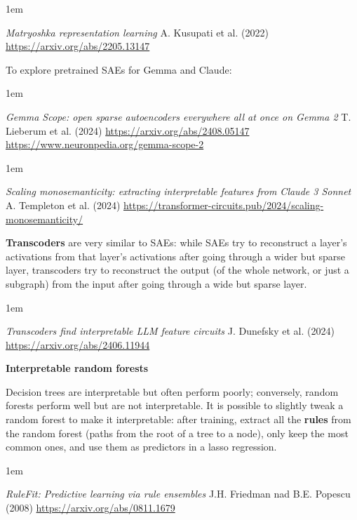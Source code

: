 \documentclass[a5paper]{article}
\let\d\textbf
\newenvironment{reference}{%
  \medskip\goodbreak
  \parskip 0pt
  \raggedright
  \leftskip 1em
  \obeylines
}{\par\medskip\goodbreak}
\def\subsection#1{{\par\bigskip\goodbreak\large\bfseries #1\par}}
\begin{document}
\begin{reference}
  \emph{Matryoshka representation learning}
  A. Kusupati et al. (2022)
  \url{https://arxiv.org/abs/2205.13147}
\end{reference}

To explore pretrained SAEs for Gemma and Claude:

\begin{reference}
  \emph{Gemma Scope: open sparse autoencoders everywhere all at once on Gemma 2}
  T. Lieberum et al. (2024)
  \url{https://arxiv.org/abs/2408.05147}
  \url{https://www.neuronpedia.org/gemma-scope-2}
\end{reference}

\begin{reference}
  \emph{Scaling monosemanticity: extracting interpretable features from Claude 3 Sonnet}
  A. Templeton et al. (2024)
  \url{https://transformer-circuits.pub/2024/scaling-monosemanticity/}
\end{reference}

\d{Transcoders} are very similar to SAEs:
while SAEs try to reconstruct a layer's activations from that layer's activations
after going through a wider but sparse layer,
transcoders try to reconstruct the output (of the whole network, or just a subgraph)
from the input after going through a wide but sparse layer.

\begin{reference}
  \emph{Transcoders find  interpretable LLM feature circuits}
  J. Dunefsky et al. (2024)
  \url{https://arxiv.org/abs/2406.11944}
\end{reference}

\subsection{Interpretable random forests}

Decision trees are interpretable but often perform poorly;
conversely, random forests perform well but are not interpretable.
It is possible to slightly tweak a random forest to make it interpretable:
after training, extract all the \d{rules} from the random forest
(paths from the root of a tree to a node), only keep the most common ones,
and use them as predictors in a lasso regression.

\begin{reference}
  \emph{RuleFit: Predictive learning via rule ensembles}
  J.H. Friedman nad B.E. Popescu (2008)
  \url{https://arxiv.org/abs/0811.1679}
\end{reference}
\end{document}
